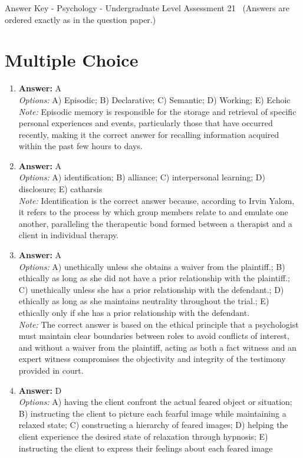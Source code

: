 \documentclass[12pt]{article}
\begin{document}
\begin{center}
Answer Key - Psychology - Undergraduate Level Assessment 21 \
\small (Answers are ordered exactly as in the question paper.)
\end{center}

\section*{Multiple Choice}
\begin{enumerate}[label=\arabic*.]
\item \textbf{Answer:} A
\\ \textit{Options:} A) Episodic; B) Declarative; C) Semantic; D) Working; E) Echoic
\\ \textit{Note:} Episodic memory is responsible for the storage and retrieval of specific personal experiences and events, particularly those that have occurred recently, making it the correct answer for recalling information acquired within the past few hours to days.
\item \textbf{Answer:} A
\\ \textit{Options:} A) identification; B) alliance; C) interpersonal learning; D) disclosure; E) catharsis
\\ \textit{Note:} Identification is the correct answer because, according to Irvin Yalom, it refers to the process by which group members relate to and emulate one another, paralleling the therapeutic bond formed between a therapist and a client in individual therapy.
\item \textbf{Answer:} A
\\ \textit{Options:} A) unethically unless she obtains a waiver from the plaintiff.; B) ethically as long as she did not have a prior relationship with the plaintiff.; C) unethically unless she has a prior relationship with the defendant.; D) ethically as long as she maintains neutrality throughout the trial.; E) ethically only if she has a prior relationship with the defendant.
\\ \textit{Note:} The correct answer is based on the ethical principle that a psychologist must maintain clear boundaries between roles to avoid conflicts of interest, and without a waiver from the plaintiff, acting as both a fact witness and an expert witness compromises the objectivity and integrity of the testimony provided in court.
\item \textbf{Answer:} D
\\ \textit{Options:} A) having the client confront the actual feared object or situation; B) instructing the client to picture each fearful image while maintaining a relaxed state; C) constructing a hierarchy of feared images; D) helping the client experience the desired state of relaxation through hypnosis; E) instructing the client to express their feelings about each feared image

\end{enumerate}
\end{document}
